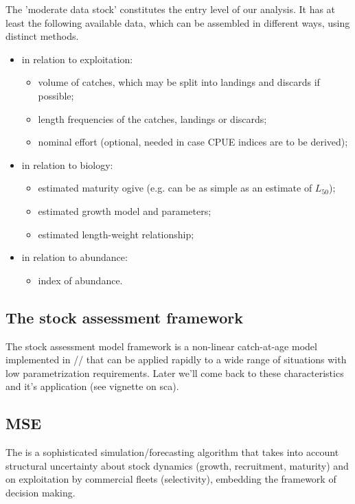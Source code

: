 \documentclass[a4paper,english,10pt]{article}\usepackage[]{graphicx}\usepackage[]{color}
\begin{document}
The 'moderate data stock' constitutes the entry level of our analysis. It has at least the following available data, which can be assembled in different ways, using distinct methods.
 
\begin{itemize}
	\item in relation to exploitation:
	\begin{itemize}
		\item volume of catches, which may be split into landings and discards if possible;
		\item length frequencies of the catches, landings or discards;
		\item nominal effort (optional, needed in case CPUE indices are to be derived);
	\end{itemize}
	\item in relation to biology:
	\begin{itemize}
		\item estimated maturity ogive (e.g. can be as simple as an estimate of $L_{50}$);
		\item estimated growth model and parameters;
		\item estimated length-weight relationship;
	\end{itemize}
	\item in relation to abundance:
	\begin{itemize}
		\item index of abundance.
	\end{itemize}	
\end{itemize}

\subsection{The stock assessment framework}

The stock assessment model framework is a non-linear catch-at-age model implemented in // that can be applied rapidly to a wide range of situations with low parametrization requirements. Later we'll come back to these characteristics and it's application (see vignette on sca).

\subsection{MSE}

The \MSE is a sophisticated simulation/forecasting algorithm that takes into account structural uncertainty about stock dynamics (growth, recruitment, maturity) and on exploitation by commercial fleets (selectivity), embedding the framework of decision making. 
\end{document}
